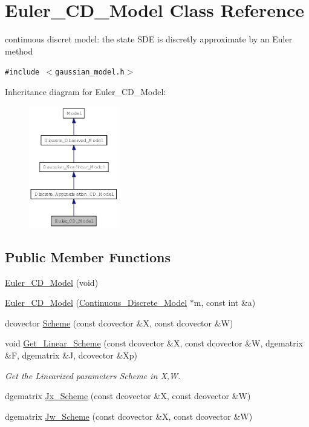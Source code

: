 \hypertarget{class_euler___c_d___model}{
\section{Euler\_\-CD\_\-Model Class Reference}
\label{class_euler___c_d___model}
}
continuous discret model: the state SDE is discretly approximate by an Euler method  


{\tt \#include $<$gaussian\_\-model.h$>$}

Inheritance diagram for Euler\_\-CD\_\-Model:\nopagebreak
\begin{figure}[H]
\begin{center}
\leavevmode
\includegraphics[width=111pt]{class_euler___c_d___model__inherit__graph}
\end{center}
\end{figure}
\subsection*{Public Member Functions}
\begin{CompactItemize}
\item 
\hyperlink{class_euler___c_d___model_10ce5994cf0e94c995e39984ca7d5839}{Euler\_\-CD\_\-Model} (void)
\item 
\hyperlink{class_euler___c_d___model_ca92bef525ab4e38db0cdd66f1ad34fd}{Euler\_\-CD\_\-Model} (\hyperlink{class_continuous___discrete___model}{Continuous\_\-Discrete\_\-Model} $\ast$m, const int \&a)
\item 
dcovector \hyperlink{class_euler___c_d___model_c113d0fdd6ba262f11ddfc0446827469}{Scheme} (const dcovector \&X, const dcovector \&W)
\item 
void \hyperlink{class_euler___c_d___model_e67b3130695db99e6057811914994aed}{Get\_\-Linear\_\-Scheme} (const dcovector \&X, const dcovector \&W, dgematrix \&F, dgematrix \&J, dcovector \&Xp)
\begin{CompactList}\small\item\em Get the Linearized parameters Scheme in X,W. \item\end{CompactList}\item 
dgematrix \hyperlink{class_euler___c_d___model_31ea181a55cb1b348bd483f5fe077c50}{Jx\_\-Scheme} (const dcovector \&X, const dcovector \&W)
\item 
dgematrix \hyperlink{class_euler___c_d___model_d4b9cef601904d1e86c2f3a5f9e01b06}{Jw\_\-Scheme} (const dcovector \&X, const dcovector \&W)
\end{CompactItemize}


